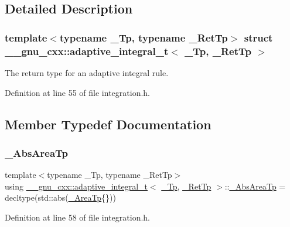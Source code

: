 \subsection{Detailed Description}
\subsubsection*{template$<$typename \+\_\+\+Tp, typename \+\_\+\+Ret\+Tp$>$\newline
struct \+\_\+\+\_\+gnu\+\_\+cxx\+::adaptive\+\_\+integral\+\_\+t$<$ \+\_\+\+Tp, \+\_\+\+Ret\+Tp $>$}

The return type for an adaptive integral rule. 

Definition at line 55 of file integration.\+h.



\subsection{Member Typedef Documentation}
\mbox{\label{struct____gnu__cxx_1_1adaptive__integral__t_a2da7a99af03e272efd03b876a6b28308}} 
\subsubsection{\texorpdfstring{\+\_\+\+Abs\+Area\+Tp}{\_AbsAreaTp}}
{\footnotesize\ttfamily template$<$typename \+\_\+\+Tp, typename \+\_\+\+Ret\+Tp$>$ \\
using \hyperlink{struct____gnu__cxx_1_1adaptive__integral__t}{\+\_\+\+\_\+gnu\+\_\+cxx\+::adaptive\+\_\+integral\+\_\+t}$<$ \hyperlink{namespace____gnu__cxx_a3b19a9c800ca194374ef9172290f7d79}{\+\_\+\+Tp}, \hyperlink{namespace____gnu__cxx_a886e03ece3d53ff7fa6c098a40f93fa5}{\+\_\+\+Ret\+Tp} $>$\+::\hyperlink{struct____gnu__cxx_1_1adaptive__integral__t_a2da7a99af03e272efd03b876a6b28308}{\+\_\+\+Abs\+Area\+Tp} =  decltype(std\+::abs(\hyperlink{struct____gnu__cxx_1_1adaptive__integral__t_a9371ae517b6bff468e44130718d90f8b}{\+\_\+\+Area\+Tp}\{\}))}



Definition at line 58 of file integration.\+h.

